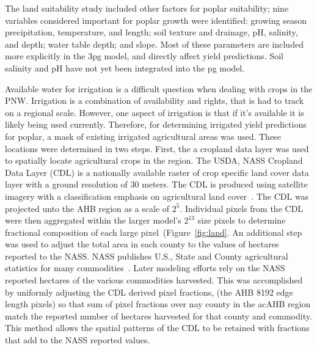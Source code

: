 \documentclass[preprint,12pt]{elsarticle}
\begin{document}
The land suitability study included other factors for poplar
suitability; nine variables considered important for poplar growth
were identified: growing season precipitation, temperature, and
length; soil texture and drainage, pH, salinity, and depth; water
table depth; and slope.  Most of these parameters are included more
explicitly in the \ac{3pg} model, and directly affect yield
predictions.  Soil salinity and pH have not yet been integrated into
the \ac{pg} model.


Available water for irrigation is a difficult question when dealing
with crops in the \ac{PNW}.  Irrigation is a combination of
availability and rights, that is had to track on a regional scale.
However, one aspect of irrigation is that if it's available it is
likely being used currently.  Therefore, for determining irrigated
yield predictions for poplar, a mask of existing irrigated
agricultural areas was used.  These locations were determined in two
steps.  First, the a cropland data layer was used to spatially locate
agricultural crops in the region.  The USDA, NASS Cropland Data Layer
(CDL) is a nationally available raster of crop specific land cover
data layer with a ground resolution of 30 meters.  The CDL is produced
using satellite imagery with a classification emphasis on agricultural
land cover~\cite{cdl2011}.  The CDL was projected unto the \ac{AHB}
region as a scale of $2^5$.  Individual pixels from the CDL were then
aggregated within the larger model's $2^13$ size pixels to determine
fractional composition of each large pixel~(Figure~\ref{fig:land}.  An
additional step was used to adjust the total area in each county to
the values of hectares reported to the \ac{NASS}.  \ac{NASS} publishes
U.S., State and County agricultural statistics for many
commodities~\cite{nass-quick-stats}.  Later modeling efforts rely on
the \ac{NASS} reported hectares of the various commodities harvested.
This was accomplished by uniformly adjusting the CDL derived pixel
fractions, (the \ac{AHB} 8192 edge length pixels) so that sum of pixel
fractions over nay county in the ac{AHB} region match the reported
number of hectares harvested for that county and commodity.  This
method allows the spatial patterns of the CDL to be retained with
fractions that add to the \ac{NASS} reported values.
\end{document}
